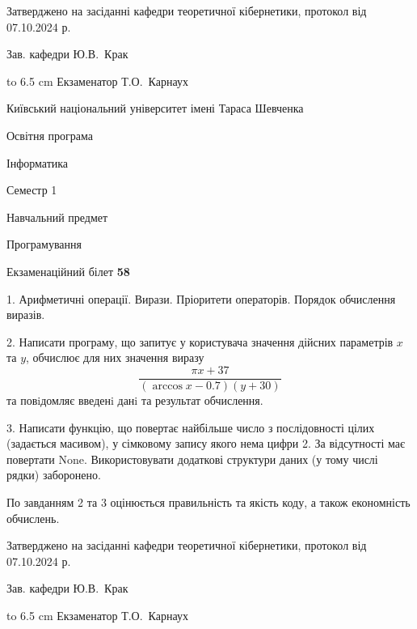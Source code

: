 \documentclass[12pt, ukrainian]{article}
\begin{document}
{\smallskip\smallskip \begin {scriptsize} Затверджено на засіданні кафедри теоретичної кібернетики, протокол   від   07.10.2024 р.\par\smallskip\smallskip\smallskip\smallskip
{\parbox {6.5 cm} {Зав. кафедри \dotfill Ю.В.~Крак}}\hspace {0.7cm} {\hbox to 6.5 cm { Екзаменатор \dotfill Т.О.~Карнаух}} \end{scriptsize}}
\newpage
{{\begin {scriptsize}\par
{ \center  Київський національний університет імені Тараса Шевченка \par}
{\parbox {5 cm}{Освітня програма \hfill}{\parbox {7 cm}{Інформатика\hfill}}\parbox {6 cm}{\hfill Семестр 1}}\par
{\parbox {5 cm} {Навчальний предмет \hfill}\parbox {7 cm}{Програмування \hfill}\parbox {6cm}{\hfill}\par}\vspace{-15pt} \end{scriptsize}}{\center Екзаменаційний білет \No \textbf { 58 }\par}}
{%
1. Арифметичні операції. Вирази. Пріоритети операторів. Порядок обчислення виразів.%
\par
2. Написати програму, що запитує у користувача значення дійсних параметрів $x$ та $y$, обчислює для них значення виразу 
$$\frac{\pi x + 37}{(\arccos x - 0.7) (y + 30)}$$ 
та повiдомляє введенi данi та результат обчислення.

\par
3. Написати функцію, що повертає найбільше число з послідовності цілих (задається масивом), у сімковому запису якого нема цифри 2. За відсутності має повертати None. Використовувати додаткові структури даних (у тому числі рядки) заборонено.

По завданням 2 та 3 оцінюється правильність та якість коду, а також економність обчислень.

}
{\smallskip\smallskip \begin {scriptsize} Затверджено на засіданні кафедри теоретичної кібернетики, протокол   від   07.10.2024 р.\par\smallskip\smallskip\smallskip\smallskip
{\parbox {6.5 cm} {Зав. кафедри \dotfill Ю.В.~Крак}}\hspace {0.7cm} {\hbox to 6.5 cm { Екзаменатор \dotfill Т.О.~Карнаух}} \end{scriptsize}}
\vspace{0.9cm}
\end{document}
